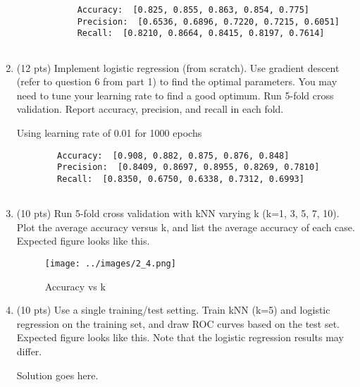 \documentclass[a4paper]{article}
\theoremstyle{definition}
\newenvironment{soln}{
    \leavevmode\color{blue}\ignorespaces
}{}
\begin{document}
\begin{enumerate}
	\begin{soln}
		\begin{verbatim}
			Accuracy:  [0.825, 0.855, 0.863, 0.854, 0.775]
			Precision:  [0.6536, 0.6896, 0.7220, 0.7215, 0.6051]
			Recall:  [0.8210, 0.8664, 0.8415, 0.8197, 0.7614]
			
		\end{verbatim}
	\end{soln}
	
	\item (12 pts) Implement logistic regression (from scratch). Use gradient descent (refer to question 6 from part 1) to find the optimal parameters. You may need to tune your learning rate to find a good optimum. Run 5-fold cross validation. Report accuracy, precision, and recall in each fold.
	
	\begin{soln}
	Using learning rate of 0.01 for 1000 epochs
	\begin{verbatim}
		Accuracy:  [0.908, 0.882, 0.875, 0.876, 0.848]
		Precision:  [0.8409, 0.8697, 0.8955, 0.8269, 0.7810]
		Recall:  [0.8350, 0.6750, 0.6338, 0.7312, 0.6993]
		

	\end{verbatim}
	\end{soln}
	
	\item (10 pts) Run 5-fold cross validation with kNN varying k (k=1, 3, 5, 7, 10). Plot the average accuracy versus k, and list the average accuracy of each case. \\
	Expected figure looks like this.

	\begin{soln} 
		\begin{figure}[H]
			\centering
			\texttt{[image: ../images/2\_4.png]}
			\caption{Accuracy vs k}
			\label{fig:knn_4}
		\end{figure}
	\end{soln}
	
	\item (10 pts) Use a single training/test setting. Train kNN (k=5) and logistic regression on the training set, and draw ROC curves based on the test set. \\
	Expected figure looks like this.
	Note that the logistic regression results may differ.
	
	\begin{soln}  Solution goes here. \end{soln}
	
\end{enumerate}

\end{document}
